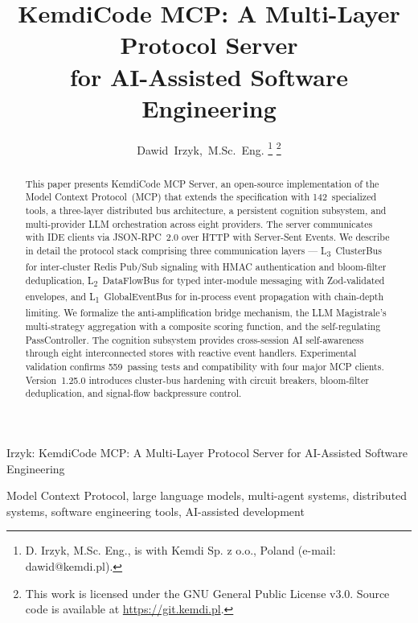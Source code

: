 \documentclass[journal,10pt]{IEEEtran}
\newcommand{\layerthree}{L\textsubscript{3}}
\newcommand{\layertwo}{L\textsubscript{2}}
\newcommand{\layerone}{L\textsubscript{1}}
\begin{document}
\title{KemdiCode MCP: A Multi-Layer Protocol Server\\for AI-Assisted Software Engineering}

\author{Dawid~Irzyk,~M.Sc.~Eng.%
\thanks{D. Irzyk, M.Sc. Eng., is with Kemdi Sp. z o.o., Poland (e-mail: dawid@kemdi.pl).}%
\thanks{This work is licensed under the GNU General Public License v3.0. Source code is available at \url{https://git.kemdi.pl}.}}

%
{Irzyk: KemdiCode MCP: A Multi-Layer Protocol Server for AI-Assisted Software Engineering}

\maketitle

\begin{abstract}
This paper presents KemdiCode MCP Server, an open-source implementation of the Model Context Protocol~(MCP) that extends the specification with 142~specialized tools, a three-layer distributed bus architecture, a persistent cognition subsystem, and multi-provider LLM orchestration across eight providers. The server communicates with IDE clients via JSON-RPC~2.0 over HTTP with Server-Sent Events. We describe in detail the protocol stack comprising three communication layers --- \layerthree~ClusterBus for inter-cluster Redis Pub/Sub signaling with HMAC authentication and bloom-filter deduplication, \layertwo~DataFlowBus for typed inter-module messaging with Zod-validated envelopes, and \layerone~GlobalEventBus for in-process event propagation with chain-depth limiting. We formalize the anti-amplification bridge mechanism, the LLM Magistrale's multi-strategy aggregation with a composite scoring function, and the self-regulating PassController. The cognition subsystem provides cross-session AI self-awareness through eight interconnected stores with reactive event handlers. Experimental validation confirms 559~passing tests and compatibility with four major MCP clients. Version~1.25.0 introduces cluster-bus hardening with circuit breakers, bloom-filter deduplication, and signal-flow backpressure control.
\end{abstract}

\begin{IEEEkeywords}
Model Context Protocol, large language models, multi-agent systems, distributed systems, software engineering tools, AI-assisted development
\end{IEEEkeywords}
\end{document}
